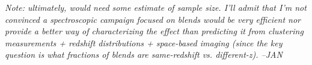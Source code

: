 {\em Note: ultimately, would need some estimate of sample size.  I'll admit that I'm not convinced a spectroscopic campaign focused on blends would be very efficient nor provide a better way of characterizing the effect than predicting it from clustering measurements + redshift distributions + space-based imaging (since the key question is what fractions of blends are same-redshift vs. different-z). --JAN}
